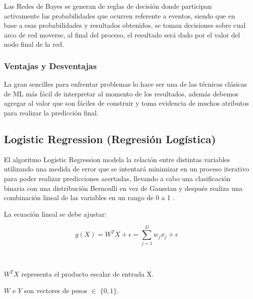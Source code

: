 \par Las Redes de Bayes se generan de reglas de decisión donde participan activamente las probabilidades que ocurren referente a eventos, siendo que en base a esas probabilidades y resultados obtenidos, se toman decisiones sobre cual arco de red moverse, al final del proceso, el resultado será dado por el valor del nodo final de la red.\\


\doublespacing
\subsubsection{Ventajas y Desventajas}
La gran sencilles para enfrentar problemas lo hace ser una de las técnicas clásicas de ML más fácil de interpretar al momento de los resultados, además debemos agregar al valor que son fáciles de construir y toma evidencia de muchos atributos para realizar la predicción final.\\


\doublespacing
\subsection{Logistic Regression (Regresión Logística)}
El algoritmo Logistic Regression modela la relación entre distintas variables utilizando una medida de error que se intentará minimizar en un proceso iterativo para poder realizar predicciones acertadas, llevando a cabo una clasificación binaria con una distribución Bernoulli en vez de Gaussian y después realiza una combinación lineal de las variables en un rango de 0 a 1 \cite{ Stoltzfus2011}.\\
\par La ecuación lineal se debe ajustar:\\
\begin{Large}
	\begin{equation}
		y(X)=W^{T}X + \epsilon = \sum_{j=1}^{D}w_{j}x_{j} + \epsilon
	\end{equation}
\end{Large}\\ 
\par $W^{T}X$ representa el producto escalar de entrada X.
\par $W$ e $Y$ son vectores de pesos $\in$ $\lbrace 0,1 \rbrace$.\\

